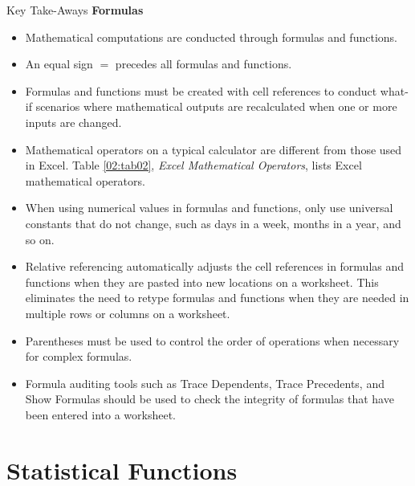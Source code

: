 \begin{center}
	\begin{tkwbox}{Key Take-Aways}
		\textbf{Formulas}
		\\
		\begin{itemize}
			\setlength{\itemsep}{0pt}
			\setlength{\parskip}{0pt}
			\setlength{\parsep}{0pt}
			
			\item Mathematical computations are conducted through formulas and functions.
			\item An equal sign $ = $ precedes all formulas and functions.
			\item Formulas and functions must be created with cell references to conduct what-if scenarios where mathematical outputs are recalculated when one or more inputs are changed.
			\item Mathematical operators on a typical calculator are different from those used in Excel. Table \ref{02:tab02}, \textit{Excel Mathematical Operators}, lists Excel mathematical operators.
			\item When using numerical values in formulas and functions, only use universal constants that do not change, such as days in a week, months in a year, and so on.
			\item Relative referencing automatically adjusts the cell references in formulas and functions when they are pasted into new locations on a worksheet. This eliminates the need to retype formulas and functions when they are needed in multiple rows or columns on a worksheet.
			\item Parentheses must be used to control the order of operations when necessary for complex formulas.
			\item Formula auditing tools such as Trace Dependents, Trace Precedents, and Show Formulas should be used to check the integrity of formulas that have been entered into a worksheet.
			
		\end{itemize}
	\end{tkwbox}
\end{center}

\section{Statistical Functions}\label{ch02:statistical_functions}

